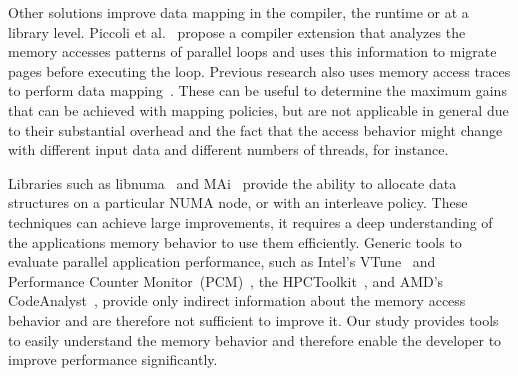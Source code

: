 
Other solutions improve data mapping in the compiler, the runtime or at a library level.
Piccoli et al.~\cite{Piccoli2014} propose a compiler extension that analyzes
the memory accesses patterns of parallel loops and uses this information to migrate
pages before executing the loop.
Previous research also uses memory access traces to perform data mapping~\cite{Marathe2010,Bolosky1992}. These can be useful to determine the maximum gains that can be achieved with mapping policies, but are not applicable in general due to their substantial overhead and the fact that the access behavior might change with different input data and different numbers of threads, for instance.


Libraries such as libnuma~\cite{Kleen2004} and MAi~\cite{Ribeiro2009} provide
the ability to allocate data structures on a particular NUMA node, or with an
interleave policy. These techniques can achieve large improvements, it
requires a deep understanding of the applications memory behavior to use them
efficiently.
Generic tools to evaluate parallel application performance, such as Intel's
VTune~\cite{Reinders05VTune} and Performance Counter
Monitor~(PCM)~\cite{Intel2012b}, the HPCToolkit~\cite{Adhianto10HPCTOOLKIT},
and AMD's CodeAnalyst~\cite{Drongowski2008}, provide only indirect information
about the memory access behavior and are therefore not sufficient to improve it.
Our study provides tools to easily understand the memory behavior
and therefore enable the developer to improve performance significantly.

%

